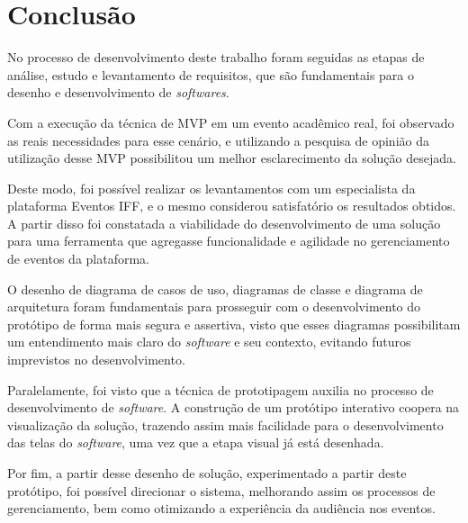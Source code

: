 \chapter{Conclusão}

No processo de desenvolvimento deste trabalho foram seguidas as etapas de análise, estudo e levantamento de requisitos, que são fundamentais para o desenho e desenvolvimento de \textit{softwares}.

Com a execução da técnica de MVP em um evento acadêmico real, foi observado as reais necessidades para esse cenário, e utilizando a pesquisa de opinião da utilização desse MVP possibilitou um melhor esclarecimento da solução desejada.

Deste modo, foi possível realizar os levantamentos com um especialista da plataforma Eventos IFF, e o mesmo considerou satisfatório os resultados obtidos. A partir disso foi constatada a viabilidade do desenvolvimento de uma solução para uma ferramenta que agregasse funcionalidade e agilidade no gerenciamento de eventos da plataforma.

O desenho de diagrama de casos de uso, diagramas de classe e diagrama de arquitetura foram fundamentais para prosseguir com o desenvolvimento do protótipo de forma mais segura e assertiva, visto que esses diagramas possibilitam um entendimento mais claro do \textit{software} e seu contexto, evitando futuros imprevistos no desenvolvimento.

Paralelamente, foi visto que a técnica de prototipagem auxilia no processo de desenvolvimento de \textit{software}. A construção de um protótipo interativo coopera na visualização da solução, trazendo assim mais facilidade para o desenvolvimento das telas do \textit{software}, uma vez que a etapa visual já está desenhada. 

Por fim, a partir desse desenho de solução, experimentado a partir deste protótipo, foi possível direcionar o sistema, melhorando assim os processos de gerenciamento, bem como otimizando a experiência da audiência nos eventos.
